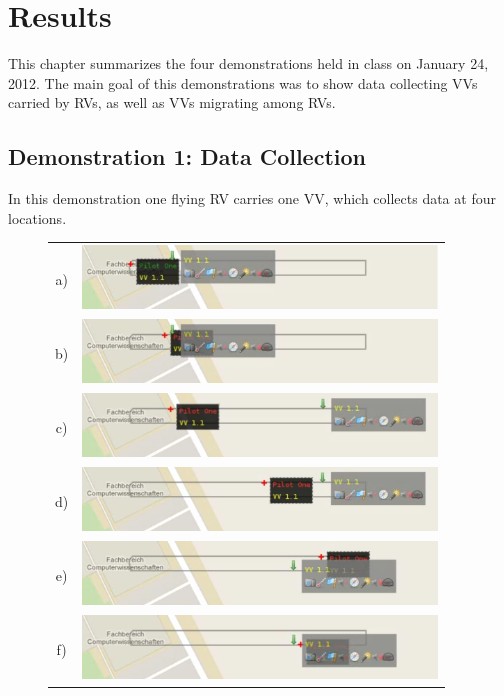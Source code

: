 
\chapter{Results}

This chapter summarizes the four demonstrations held in class on January 24, 2012. The main goal of this
demonstrations was to show data collecting \acp{VV} carried by \acp{RV}, as well as \acp{VV} migrating
among \acp{RV}.


\section{Demonstration 1: Data Collection}
In this demonstration one flying \ac{RV} carries one \ac{VV}, which collects data at four locations.
\begin{figure}[h]
	\begin{center}
		\begin{tabular}{cc}
			a)&{\includegraphics[width=9.4cm]{ese-demo1-1.png}} \\
			b)&{\includegraphics[width=9.4cm]{ese-demo1-2.png}} \\
			
			c)&{\includegraphics[width=9.4cm]{ese-demo1-3.png}} \\
			d)&{\includegraphics[width=9.4cm]{ese-demo1-4.png}} \\
			
			e)&{\includegraphics[width=9.4cm]{ese-demo1-5.png}} \\
			f)&{\includegraphics[width=9.4cm]{ese-demo1-6.png}} \\
	

\end{tabular}
\end{center}
\end{figure}

